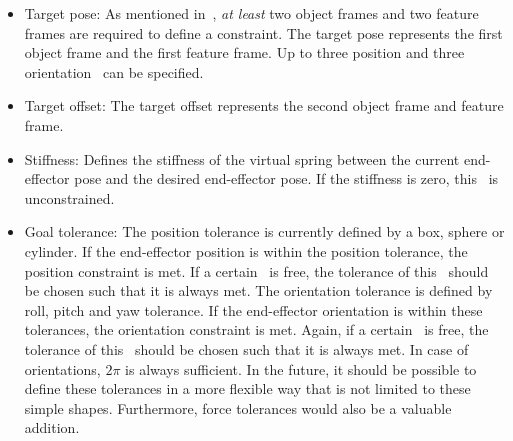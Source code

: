 \begin{itemize}
    \item Target pose: As mentioned in~\citet{DeSchutter2007}, \emph{at least} two object frames and two feature frames are required to define a constraint.
    The target pose represents the first object frame and the first feature frame. 
	Up to three position and three orientation \dofs\ can be specified.    
	\item Target offset:  The target offset represents the second object frame and feature frame. %
    \item Stiffness: Defines the stiffness of the virtual spring between the current end-effector pose and the desired end-effector pose. If the stiffness is zero, this \dof\ is unconstrained.
    \item Goal tolerance: The position tolerance is currently defined by a box, sphere or cylinder. If the end-effector position is within the position tolerance, the position constraint is met. If a certain \dof\ is free, the tolerance of this \dof\ should be chosen such that it is always met. The orientation tolerance is defined by roll, pitch and yaw tolerance. If the end-effector orientation is within these tolerances, the orientation constraint is met. Again, if a certain \dof\ is free, the tolerance of this \dof\ should be chosen such that it is always met. In case of orientations, $2\pi$ is always sufficient. In the future, it should be possible to define these tolerances in a more flexible way that is not limited to these simple shapes. Furthermore, force tolerances would also be a valuable addition.
\end{itemize}

